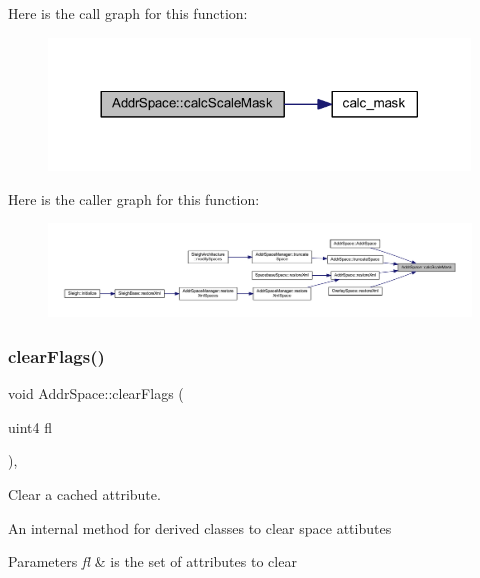 Here is the call graph for this function\+:
\nopagebreak
\begin{figure}[H]
\begin{center}
\leavevmode
\includegraphics[width=317pt]{class_addr_space_af61640170c0baa861bbacee0e5c22a31_cgraph}
\end{center}
\end{figure}
Here is the caller graph for this function\+:
\nopagebreak
\begin{figure}[H]
\begin{center}
\leavevmode
\includegraphics[width=350pt]{class_addr_space_af61640170c0baa861bbacee0e5c22a31_icgraph}
\end{center}
\end{figure}
\mbox{\label{class_addr_space_a523bc5940337efda7c00745c06c4346f}} 
\subsubsection{\texorpdfstring{clearFlags()}{clearFlags()}}
{\footnotesize\ttfamily void Addr\+Space\+::clear\+Flags (\begin{DoxyParamCaption}\item[{uint4}]{fl }\end{DoxyParamCaption})\hspace{0.3cm}{\ttfamily [inline]}, {\ttfamily [protected]}}



Clear a cached attribute. 

An internal method for derived classes to clear space attibutes 
\begin{DoxyParams}{Parameters}
{\em fl} & is the set of attributes to clear \\
\hline
\end{DoxyParams}



